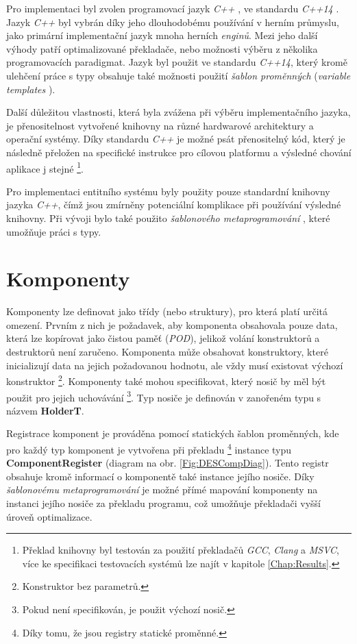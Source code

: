 Pro implementaci byl zvolen programovací jazyk \emph{C++} \cite{IsoCpp}, ve standardu \emph{C++14} \cite{Cpp14}. Jazyk \emph{C++} byl vybrán díky jeho dlouhodobému používání v herním průmyslu, jako primární implementační jazyk mnoha herních \emph{enginů}. Mezi jeho další výhody patří optimalizované překladače, nebo možnosti výběru z několika programovacích paradigmat. Jazyk byl použit ve standardu \emph{C++14}, který kromě ulehčení práce s typy obsahuje také možnosti použití \emph{šablon proměnných} (\emph{variable templates} \cite{Cpp14VarTemplate}). 

Další důležitou vlastnosti, která byla zvážena při výběru implementačního jazyka, je přenositelnost vytvořené knihovny na různé hardwarové architektury a operační systémy. Díky standardu \emph{C++} je možné psát přenositelný kód, který je následně přeložen na specifické instrukce pro cílovou platformu a výsledné chování aplikace j stejné \footnote{Překlad knihovny byl testován za použití překladačů \emph{GCC}, \emph{Clang} a \emph{MSVC}, více ke specifikaci testovacích systémů lze najít v kapitole \ref{Chap:Results}.}. 

Pro implementaci entitního systému byly použity pouze standardní knihovny jazyka \emph{C++}, čímž jsou zmírněny potenciální komplikace při používání výsledné knihovny. Při vývoji bylo také použito \emph{šablonového metaprogramování} \cite{CppMetaprogramming}, které umožňuje práci s typy.

\section{Komponenty}

Komponenty lze definovat jako třídy (nebo struktury), pro která platí určitá omezení. Prvním z nich je požadavek, aby komponenta obsahovala pouze data, která lze kopírovat jako čistou paměť (\emph{POD}), jelikož volání konstruktorů a destruktorů není zaručeno. Komponenta může obsahovat konstruktory, které inicializují data na jejich požadovanou hodnotu, ale vždy musí existovat výchozí konstruktor \footnote{Konstruktor bez parametrů.}. Komponenty také mohou specifikovat, který nosič by měl být použit pro jejich uchovávání \footnote{Pokud není specifikován, je použit výchozí nosič.}. Typ nosiče je definován v zanořeném typu s názvem \textbf{HolderT}.

Registrace komponent je prováděna pomocí statických šablon proměnných, kde pro každý typ komponent je vytvořena při překladu \footnote{Díky tomu, že jsou registry statické proměnné.} instance typu \textbf{ComponentRegister} (diagram na obr. \ref{Fig:DESCompDiag}). Tento registr obsahuje kromě informací o komponentě také instance jejího nosiče. Díky \emph{šablonovému metaprogramování} je možné přímé mapování komponenty na instanci jejího nosiče za překladu programu, což umožňuje překladači vyšší úroveň optimalizace.

